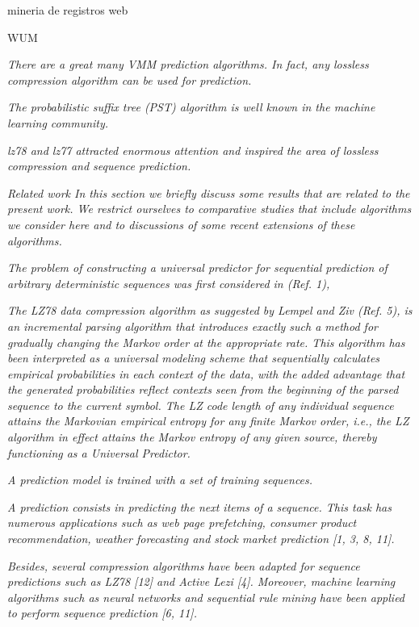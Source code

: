 mineria de registros web


WUM


\emph{There are a great many VMM prediction algorithms. In fact, any lossless compression algorithm can be used for prediction.}~\cite{Begleiter2004} 

\emph{ The probabilistic suffix tree (PST) algorithm is well known in the machine learning community.}~\cite{Begleiter2004} 

\emph{lz78 and lz77 attracted enormous attention and inspired the area of lossless compression and sequence prediction.}~\cite{Begleiter2004} 


\emph{Related work
In this section we briefly discuss some results that are related to the present work. We restrict ourselves to comparative studies that include algorithms we consider here and to discussions of some recent extensions of these algorithms.}~\cite{Begleiter2004}

\emph{The problem of constructing a universal predictor for sequential prediction of arbitrary deterministic sequences was first considered in (Ref. 1),}~\cite{Gopalratnam2007}


\emph{The LZ78 data compression algorithm as suggested by Lempel and Ziv (Ref. 5), is an incremental parsing algorithm that introduces exactly such a method for gradually changing the Markov order at the appropriate rate. This algorithm has been interpreted as a universal modeling scheme that sequentially calculates empirical probabilities in each context of the data, with the added advantage that the generated probabilities reflect contexts seen from the beginning of the parsed sequence to the current symbol. The LZ code length of any individual sequence attains the Markovian empirical entropy for any finite Markov order, i.e., the LZ algorithm in effect attains the Markov entropy of any given source, thereby functioning as a Universal Predictor.}~\cite{Gopalratnam2007}


\emph{A prediction model is trained with a set of training sequences.}~\cite{Gueniche2015}

\emph{A prediction consists in predicting the next items of a sequence. This task has numerous applications such as web page prefetching, consumer product recommendation, weather forecasting and stock market prediction [1, 3, 8, 11].}~\cite{Gueniche2015}


\emph{Besides, several compression algorithms have been adapted for sequence predictions such as LZ78 [12] and Active Lezi [4]. Moreover, machine learning algorithms such as neural networks and sequential rule mining have been applied to perform sequence prediction [6, 11].}~\cite{Gueniche2015}



